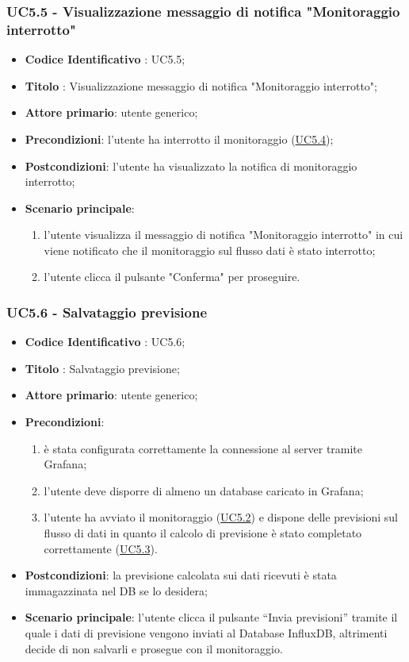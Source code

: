 	\label{par:UC5.5}
	\subsubsection{UC5.5 - Visualizzazione messaggio di notifica "Monitoraggio interrotto"}
		\begin{itemize}
			\item\textbf{Codice Identificativo} : UC5.5;
			\item\textbf{Titolo} : Visualizzazione messaggio di notifica "Monitoraggio interrotto";
			\item\textbf{Attore primario}: utente generico;
			\item\textbf{Precondizioni}: l'utente ha interrotto il monitoraggio (\hyperref[par:UC5.4]{UC5.4});
			\item\textbf{Postcondizioni}: l'utente ha visualizzato la notifica di monitoraggio interrotto;
			\item\textbf{Scenario principale}:
				\begin{enumerate}
					\item l'utente visualizza il messaggio di notifica "Monitoraggio interrotto" in cui viene notificato che il monitoraggio sul flusso dati è stato interrotto;
					\item l'utente clicca il pulsante "Conferma" per proseguire.		
				\end{enumerate}		
		\end{itemize}
		
	\label{par:UC5.6}
	\subsubsection{UC5.6 - Salvataggio previsione}
		\begin{itemize}
			\item\textbf{Codice Identificativo} : UC5.6;
			\item\textbf{Titolo} : Salvataggio previsione;
			\item\textbf{Attore primario}: utente generico;
			\item\textbf{Precondizioni}:
				\begin{enumerate}
					\item è stata configurata correttamente la connessione al server tramite Grafana;
					\item l'utente deve disporre di almeno un database caricato in Grafana;
					\item l'utente ha avviato il monitoraggio (\hyperref[par:UC5.2]{UC5.2}) e dispone delle previsioni sul flusso di dati in quanto il calcolo di previsione è stato completato correttamente (\hyperref[par:UC5.3]{UC5.3}).
				\end{enumerate}
			\item\textbf{Postcondizioni}: la previsione calcolata sui dati ricevuti è stata immagazzinata nel DB se lo desidera;
			\item\textbf{Scenario principale}: l'utente clicca il pulsante “Invia previsioni” tramite il quale i dati di previsione vengono inviati al Database InfluxDB, altrimenti decide di non salvarli e prosegue con il monitoraggio.
			
		\end{itemize}	
		
